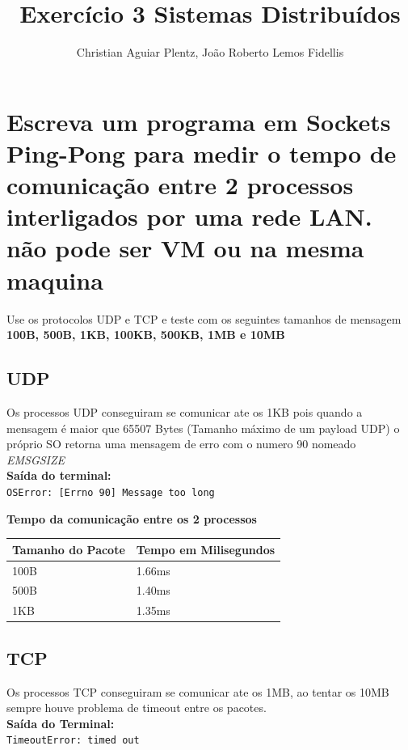 \documentclass[12pt]{article}
\title{Exercício 3 Sistemas Distribuídos}
\author{Christian Aguiar Plentz\inst{1}, João Roberto Lemos Fidellis\inst{2} }
\begin{document}
 

\maketitle

\section{ Escreva um programa em Sockets Ping-Pong para medir o tempo
    de comunicação entre 2 processos interligados por uma rede LAN.
    não pode ser VM ou na mesma maquina}

Use os protocolos UDP e TCP e teste com os seguintes tamanhos de mensagem
\textbf{100B, 500B, 1KB, 100KB, 500KB, 1MB e 10MB}

\subsection{UDP}
    Os processos UDP conseguiram se comunicar ate os 1KB pois quando a mensagem
    é maior que 65507 Bytes (Tamanho máximo de um payload UDP) o próprio SO retorna
    uma mensagem de erro com o numero 90 nomeado \textit{EMSGSIZE} \\
\textbf{Saída do terminal:} \\
\indent \texttt{OSError: [Errno 90] Message too long}

\noindent \textbf{Tempo da comunicação entre os 2 processos}

\begin{center}
\begin{tabular}{|l|l|}  %
\hline%
Tamanho do Pacote & Tempo em Milisegundos \\
\hline
    100B & 1.66ms \\
    500B & 1.40ms \\
    1KB & 1.35ms \\
\hline
\end{tabular}
\end{center}

\subsection{TCP}

Os processos TCP conseguiram se comunicar ate os 1MB, ao tentar os 10MB sempre houve problema de
timeout entre os pacotes. \\
\textbf{Saída do Terminal:} \\
\indent \texttt{TimeoutError: timed out}
\end{document}
